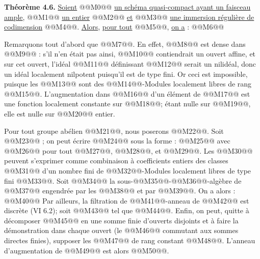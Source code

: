 
\textbf{Théorème 4.6.}
\uline{Soient} @@M0@@ \uline{un schéma quasi-compact ayant un faisceau ample}, @@M1@@ \uline{un entier} @@M2@@ \uline{et} @@M3@@ \uline{une immersion régulière de codimension} @@M4@@. \uline{Alors}, \uline{pour tout} @@M5@@, \uline{on a} :
@@M6@@

Remarquons tout d'abord que @@M7@@. En effet, @@M8@@ est dense dans @@M9@@ : s'il n'en était pas ainsi, @@M10@@ contiendrait un ouvert affine, et sur cet ouvert, l'idéal @@M11@@ définissant @@M12@@ serait un nilidéal, donc un idéal localement nilpotent puisqu'il est de type fini. Or ceci est impossible, puisque les @@M13@@ sont des @@M14@@-Modules localement libres de rang @@M15@@. L'augmentation dans @@M16@@ d'un élément de @@M17@@ est une fonction localement constante sur @@M18@@; étant nulle sur @@M19@@, elle est nulle sur @@M20@@ entier.

Pour tout groupe abélien @@M21@@, nous poserons @@M22@@. Soit @@M23@@ ; on peut écrire @@M24@@ sous la forme :
@@M25@@
avec @@M26@@ pour tout @@M27@@, @@M28@@, et @@M29@@. Les @@M30@@ peuvent s'exprimer comme combinaison à coefficients entiers des classes @@M31@@ d'un nombre fini de @@M32@@-Modules localement libres de type fini @@M33@@. Soit @@M34@@ la sous-@@M35@@-@@M36@@-algèbre de @@M37@@ engendrée par les @@M38@@ et par @@M39@@. On a alors :
@@M40@@
Par ailleurs, la filtration de @@M41@@-anneau de @@M42@@ est discrète (VI 6.2); soit @@M43@@ tel que @@M44@@. Enfin, on peut, quitte à décomposer @@M45@@ en une somme finie d'ouverts disjoints et à faire la démonstration dans chaque ouvert (le @@M46@@ commutant aux sommes directes finies), supposer les @@M47@@ de rang constant @@M48@@. L'anneau d'augmentation de @@M49@@ est alors @@M50@@.

